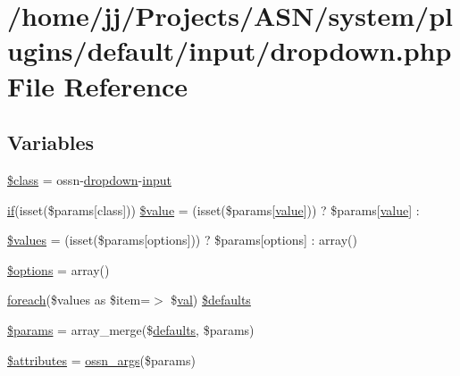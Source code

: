\hypertarget{dropdown_8php}{}\section{/home/jj/\+Projects/\+A\+S\+N/system/plugins/default/input/dropdown.php File Reference}
\label{dropdown_8php}
\subsection*{Variables}
\begin{DoxyCompactItemize}
\item 
\hyperlink{dropdown_8php_a252ba022809910ea710a068fc1bab657}{\$class} = \textquotesingle{}ossn-\/\hyperlink{jquery_8tokeninput_8js_a7195b980d89876758c8a839bcb006916}{dropdown}-\/\hyperlink{ossn_8lib_8input_8php_a64ebee98b041c4f75f71ed3cd73cc8ed}{input}\textquotesingle{}
\item 
\hyperlink{jquery_8tokeninput_8js_ad8dd46a3cbc004569e34401e9e71771a}{if}(isset(\$params\mbox{[}\textquotesingle{}class\textquotesingle{}\mbox{]})) \hyperlink{dropdown_8php_a5bd63f8afd4dd4ba86dcdf5618904298}{\$value} = (isset(\$params\mbox{[}\textquotesingle{}\hyperlink{fullpage_2plugin_8min_8js_ac56c57897e10f699d124e0103921aa20}{value}\textquotesingle{}\mbox{]})) ? \$params\mbox{[}\textquotesingle{}\hyperlink{fullpage_2plugin_8min_8js_ac56c57897e10f699d124e0103921aa20}{value}\textquotesingle{}\mbox{]} \+: \textquotesingle{}\textquotesingle{}
\item 
\hyperlink{dropdown_8php_affc45c6ace2eeb3f300b054dbf9592b6}{\$values} = (isset(\$params\mbox{[}\textquotesingle{}options\textquotesingle{}\mbox{]})) ? \$params\mbox{[}\textquotesingle{}options\textquotesingle{}\mbox{]} \+: array()
\item 
\hyperlink{dropdown_8php_a011800c63ece4cbbfa77136a20607023}{\$options} = array()
\item 
\hyperlink{user__timeline_8php_a1b18c909b5f0affc85267f294d947c4b}{foreach}(\$values as \$item=$>$ \$\hyperlink{jquery_8tokeninput_8js_a21200c34618b8c12c446cd51529ebd8c}{val}) \hyperlink{dropdown_8php_a0035e272a293e029297f6ed19d3bb10d}{\$defaults}
\item 
\hyperlink{dropdown_8php_afe68e6fbe7acfbffc0af0c84a1996466}{\$params} = array\+\_\+merge(\$\hyperlink{_chart_8_core_8js_afbaa35e32dd50615b39a75e1e5ec6921}{defaults}, \$params)
\item 
\hyperlink{dropdown_8php_adc851f7a62250e75df0490c0280aef4c}{\$attributes} = \hyperlink{ossn_8lib_8views_8php_a90922f09de8a06ea85351afb51fac9f7}{ossn\+\_\+args}(\$params)
\end{DoxyCompactItemize}


